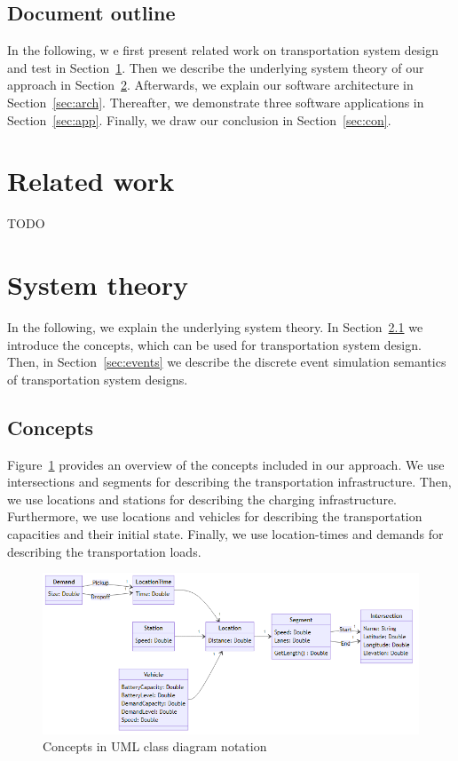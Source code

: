 \documentclass{article}
\begin{document}
    \subsection*{Document outline}
    In the following, w e first present related work on transportation system design and test in Section~\ref{sec:related}.
    Then we describe the underlying system theory of our approach in Section~\ref{sec:theory}.
    Afterwards, we explain our software architecture in Section~\ref{sec:arch}.
    Thereafter, we demonstrate three software applications in Section~\ref{sec:app}.
    Finally, we draw our conclusion in Section~\ref{sec:con}.

    \section{Related work}
    \label{sec:related}
    TODO

    \section{System theory}
    \label{sec:theory}
    In the following, we explain the underlying system theory.
    In Section~\ref{sec:concepts} we introduce the concepts, which can be used for transportation system design.
    Then, in Section~\ref{sec:events} we describe the discrete event simulation semantics of transportation system designs.

    \subsection{Concepts}
    \label{sec:concepts}
    Figure~\ref{fig:concepts} provides an overview of the concepts included in our approach.
    We use intersections and segments for describing the transportation infrastructure.
    Then, we use locations and stations for describing the charging infrastructure.
    Furthermore, we use locations and vehicles for describing the transportation capacities and their initial state.
    Finally, we use location-times and demands for describing the transportation loads.

    \begin{figure}[htbp]
        \centering
        \includegraphics[width=\textwidth]{../../diagrams/model/classes-v0.png}
        \caption{Concepts in UML class diagram notation}
        \label{fig:concepts}
    \end{figure}
\end{document}
